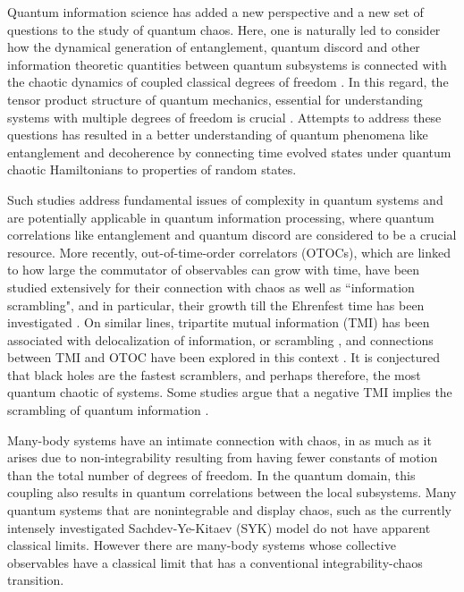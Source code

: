 \documentclass[pre,aps,showpacs,showkeys,twocolumn]{revtex4-1}
\theoremstyle{definition}
\theoremstyle{remark}
\begin{document}
Quantum information science has added a new perspective and a new set of questions to the study of quantum chaos. Here, one is naturally led to consider how the dynamical generation of entanglement, quantum discord and other information theoretic quantities between quantum subsystems is connected with the chaotic dynamics of coupled classical degrees of freedom \cite{miller1999signatures, lakshminarayan2001entangling, bandyopadhyay2002testing, ScottCaves2003, jacquod2004semiclassical, Jacq2004Erratum, PetitJacq2006, Ghose, Wang2004, trail2008entanglement, madhok2015signatures, madhok2014information}. In this regard, the tensor product structure of quantum mechanics, essential for understanding systems with multiple degrees of freedom is crucial \cite{miller1999signatures, trail2008entanglement, lakshminarayan2001entangling, bandyopadhyay2002testing}. Attempts to address these questions has resulted in a better understanding of quantum phenomena like entanglement and decoherence by connecting time evolved states under quantum chaotic Hamiltonians to properties of random states.

Such studies address fundamental issues of complexity in quantum systems and are potentially applicable in quantum information processing, where quantum correlations like entanglement and quantum discord are considered to be a crucial resource. More recently, out-of-time-order correlators (OTOCs), which are linked to how large the commutator of observables can grow with time, have been studied extensively for their connection with chaos as well as ``information scrambling", and in particular, their growth till the Ehrenfest time has been investigated \cite{braunstein2013better, hartman2013time, shenker2014black, sekino2008fast, Lashkari2013, Maldacena2016, hosur2016chaos}. On similar lines, tripartite mutual information (TMI) has been associated with delocalization of information, or scrambling \cite{IyodaSagawa}, and connections between TMI and OTOC have been explored in this context \cite{hosur2016chaos}. It is conjectured that black holes are the fastest scramblers, and perhaps therefore, the most quantum chaotic of systems. Some studies argue that a negative TMI implies the scrambling of quantum information \cite{hosur2016chaos, IyodaSagawa}.

Many-body systems have an intimate connection with chaos, in as much as it arises due to non-integrability resulting from having fewer constants of motion than the total number of degrees of freedom. In the quantum domain, this coupling also results in quantum correlations between the local subsystems. Many quantum systems that are nonintegrable and display chaos, such as the currently intensely investigated Sachdev-Ye-Kitaev (SYK) model do not have apparent classical limits. However there are many-body systems whose collective observables have a classical limit that has a conventional integrability-chaos transition.  
\end{document}
